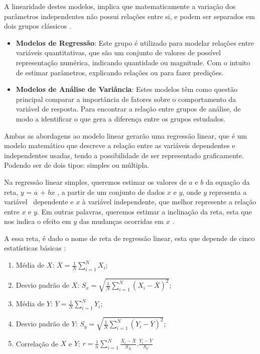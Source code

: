 \documentclass[
    12pt,               %
    openright,          %
    oneside,            %
    a4paper,            %
    english,            %
    brazil              %
    ]{abntex2}
\begin{document}
A linearidade destes modelos, implica que matematicamente a variação dos parâmetros independentes não
possui relações entre si, e podem ser separados em dois grupos clássicos \cite{tipos_modelos_lineares}.
\begin{itemize}
    \item \textbf{Modelos de Regressão}:
    Este grupo é utilizado para modelar relações entre variáveis quantitativas, que são um conjunto de
    valores de possível representação numérica, indicando quantidade ou magnitude. Com o intuito de estimar
    parâmetros, explicando relações ou para fazer predições.
    \item \textbf{Modelos de Análise de Variância}:
    Estes modelos têm como questão principal comparar a importância de fatores sobre o comportamento da
    variável de resposta. Para encontrar a relação entre grupos de análise, de modo a identificar o que
    gera a diferença entre os grupos estudados.
\end{itemize}

Ambas as abordagens ao modelo linear gerarão uma regressão linear, que é um modelo matemático que descreve 
a relação entre as variáveis dependentes e independentes usadas, tendo a possibilidade de ser representado 
graficamente. Podendo ser de dois tipos: simples ou múltipla.

Na regressão linear simples, queremos estimar os valores de $a$ e $b$ da equação da reta, $y$ = $a$ + $bx$
, a partir de um conjunto de dados $x$ e $y$, onde $y$ representa a variável  dependente e $x$ à variável 
independente, que melhor represente a relação entre $x$ e $y$. Em outras palavras, queremos estimar a 
inclinação da reta, esta que nos indica o efeito em $y$ das mudanças ocorridas em $x$ \cite{modelos_regressao_linear}.

A essa reta, é dado o nome de reta de regressão linear, esta que depende de cinco estatísticas básicas
\cite{modelos_regressao_linear}:

\begin{enumerate}
    \item Média de $X$: $\overline{X} = \frac{1}{N} \sum_{i=1}^{N} X_i$;
    \item Desvio padrão de $X$: $S_x = \sqrt{ \frac{1}{N} \sum_{i=1}^{N} (X_i - \overline{X})^2 }$;
    \item Média de $Y$: $\overline{Y} = \frac{1}{N} \sum_{i=1}^{N} Y_i$;
    \item Desvio padrão de $Y$: $S_y = \sqrt{ \frac{1}{N} \sum_{i=1}^{N} (Y_i - \overline{Y})^2 }$;
    \item Correlação de $X$ e $Y$: $r = \frac{1}{n} \sum_{i=1}^{N} \frac{X_i - \overline{X}}{S_X} . \frac{Y_i - \overline{Y}}{S_Y}$
\end{enumerate}
\end{document}
